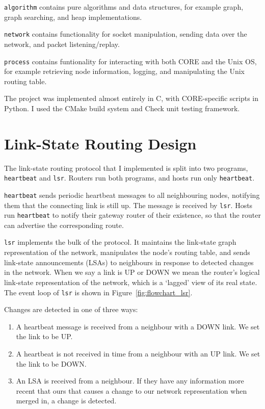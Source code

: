 \documentclass[withindex,glossary,openany]{cam-thesis}
\begin{document}
\texttt{algorithm} contains pure algorithms and data structures, for example graph, graph searching, and heap implementations.

\texttt{network} contains functionality for socket manipulation, sending data over the network, and packet listening/replay.

\texttt{process} contains funtionality for interacting with both CORE and the Unix OS, for example retrieving node information, logging, and manipulating the Unix routing table.

The project was implemented almost entirely in C, with CORE-specific scripts in Python. I used the CMake build system and Check unit testing framework.

\section{Link-State Routing Design}

The link-state routing protocol that I implemented is split into two programs, \texttt{heartbeat} and \texttt{lsr}.  Routers run both programs, and hosts run only \texttt{heartbeat}.

\texttt{heartbeat} sends periodic heartbeat messages to all neighbouring nodes, notifying them that the connecting link is still up. The message is received by \texttt{lsr}. Hosts run \texttt{heartbeat} to notify their gateway router of their existence, so that the router can advertise the corresponding route.

\texttt{lsr} implements the bulk of the protocol. It maintains the link-state graph representation of the network, manipulates the node's routing table, and sends link-state announcements (LSAs) to neighbours in response to detected changes in the network. When we say a link is UP or DOWN we mean the router's logical link-state representation of the network, which is a `lagged' view of its real state. The event loop of \texttt{lsr} is shown in Figure~\ref{fig:flowchart_lsr}.

Changes are detected in one of three ways:
\begin{enumerate}
	\item
	A heartbeat message is received from a neighbour with a DOWN link. We set the link to be UP.
	
	\item
	A heartbeat is not received in time from a neighbour with an UP link. We set the link to be DOWN.
	
	\item
	An LSA is received from a neighbour. If they have any information more recent that ours that causes a change to our network representation when merged in, a change is detected.
\end{enumerate}
\end{document}
